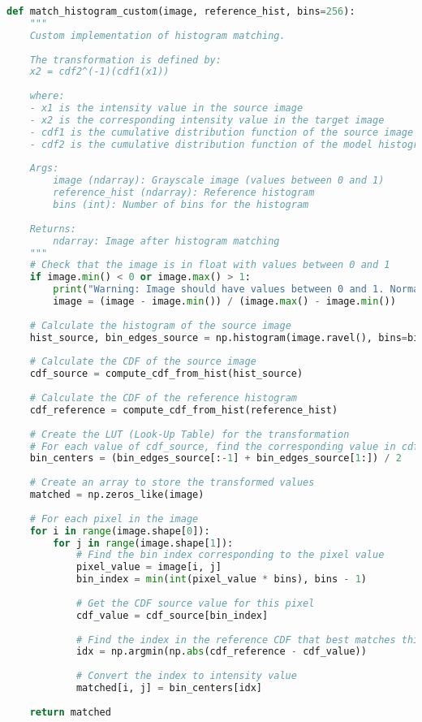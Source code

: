 \documentclass[12pt,a4paper]{article}
\begin{document}
\begin{lstlisting}[language=Python, caption=Histogram matching implementation]
def match_histogram_custom(image, reference_hist, bins=256):
    """
    Custom implementation of histogram matching.
    
    The transformation is defined by:
    x2 = cdf2^(-1)(cdf1(x1))
    
    where:
    - x1 is the intensity value in the source image
    - x2 is the corresponding intensity value in the target image
    - cdf1 is the cumulative distribution function of the source image
    - cdf2 is the cumulative distribution function of the model histogram
    
    Args:
        image (ndarray): Grayscale image (values between 0 and 1)
        reference_hist (ndarray): Reference histogram
        bins (int): Number of bins for the histogram
        
    Returns:
        ndarray: Image after histogram matching
    """
    # Check that the image is in float with values between 0 and 1
    if image.min() < 0 or image.max() > 1:
        print("Warning: Image should have values between 0 and 1. Normalization applied.")
        image = (image - image.min()) / (image.max() - image.min())
    
    # Calculate the histogram of the source image
    hist_source, bin_edges_source = np.histogram(image.ravel(), bins=bins, range=(0, 1))
    
    # Calculate the CDF of the source image
    cdf_source = compute_cdf_from_hist(hist_source)
    
    # Calculate the CDF of the reference histogram
    cdf_reference = compute_cdf_from_hist(reference_hist)
    
    # Create the LUT (Look-Up Table) for the transformation
    # For each value of cdf_source, find the corresponding value in cdf_reference
    bin_centers = (bin_edges_source[:-1] + bin_edges_source[1:]) / 2
    
    # Create an array to store the transformed values
    matched = np.zeros_like(image)
    
    # For each pixel in the image
    for i in range(image.shape[0]):
        for j in range(image.shape[1]):
            # Find the bin index corresponding to the pixel value
            pixel_value = image[i, j]
            bin_index = min(int(pixel_value * bins), bins - 1)
            
            # Get the CDF source value for this pixel
            cdf_value = cdf_source[bin_index]
            
            # Find the index in the reference CDF that best matches this value
            idx = np.argmin(np.abs(cdf_reference - cdf_value))
            
            # Convert the index to intensity value
            matched[i, j] = bin_centers[idx]
    
    return matched
\end{lstlisting}
\end{document}
